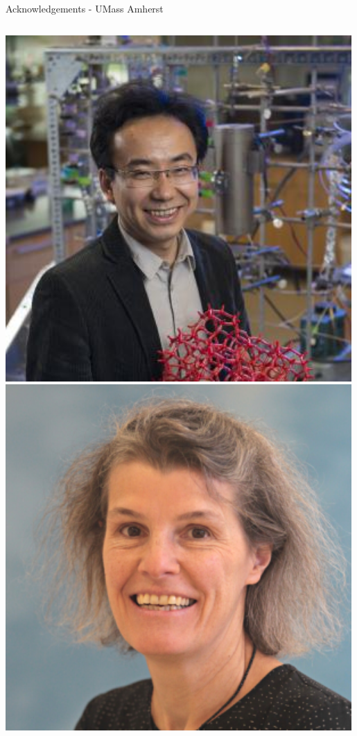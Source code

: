 \documentclass[aspectratio=169]{beamer}
\begin{document}
\begin{frame}{Acknowledgements - UMass Amherst}
\begin{columns}
            \centering
            \includegraphics[width=0.99\textwidth]{people/umassprofs/weifan.png}
            \includegraphics[width=0.99\textwidth]{people/umassprofs/jentoft.png}
            
        \end{columns}   
\end{frame}
\end{document}
